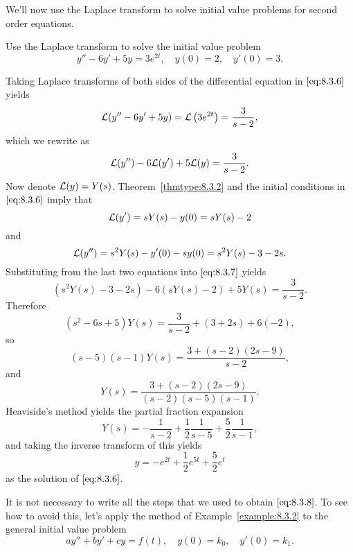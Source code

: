 \documentclass{ximera}
\begin{document}
We'll now use the Laplace transform to solve initial value problems
for  second order equations.

\begin{example}\label{example:8.3.2}
Use the Laplace transform to solve the initial value problem
\begin{equation}\label{eq:8.3.6}
y''-6y'+5y=3e^{2t},\quad y(0)=2, \quad   y'(0)=3.
\end{equation}
\begin{explanation}
Taking Laplace transforms of both sides of the differential equation in $\eqref{eq:8.3.6}$ yields
$$
{\cal L}(y''-6y'+5y)={\cal L}\left(3e^{2t}\right)=\frac{3}{s-2},
$$
which we rewrite as
\begin{equation}\label{eq:8.3.7}
{\cal L}(y'')-6{\cal L}(y')+5{\cal L}(y)=\frac{3}{s-2}.
\end{equation}
Now denote ${\cal L}(y)=Y(s)$. Theorem~\ref{thmtype:8.3.2} and the
initial conditions in $\eqref{eq:8.3.6}$ imply that
$$
{\cal L}(y')=sY(s)-y(0)=sY(s)-2
$$
and
$$
{\cal L}(y'')=s^2Y(s)-y'(0)-sy(0)=s^2Y(s)-3-2s.
$$
Substituting from the last two equations into $\eqref{eq:8.3.7}$ yields
$$
\left(s^2Y(s)-3-2s\right)-6\left(sY(s)-2\right)+5Y(s)=\frac{3}{s-2}.
$$
Therefore
\begin{equation}\label{eq:8.3.8}
(s^2-6s+5)Y(s)=\frac{3}{s-2}+(3+2s)+6(-2),
\end{equation}
so
$$
(s-5)(s-1)Y(s)=\frac{3+(s-2)(2s-9)}{s-2},
$$
and
$$
Y(s)=\frac{3+(s-2)(2s-9)}{(s-2)(s-5)(s-1)}.
$$
Heaviside's method yields the partial fraction expansion
$$
Y(s)=-\frac{1}{s-2}+\frac{1}{2}\frac{1}{s-5}+\frac{5}{2}\frac{1}{s-1},
$$
and taking the inverse transform of this yields
$$
y=-e^{2t}+\frac{1}{2}e^{5t}+\frac{5}{2}e^t
$$
as the solution of  $\eqref{eq:8.3.6}$.
\end{explanation}
\end{example}

It is not necessary to write all the steps that we used to obtain
$\eqref{eq:8.3.8}$. To see how to avoid this, let's apply the method of
Example~\ref{example:8.3.2} to the general initial value problem
\begin{equation}\label{eq:8.3.9}
ay''+by'+cy=f(t), \quad  y(0)=k_0,\quad y'(0)=k_1.
\end{equation}
\end{document}
